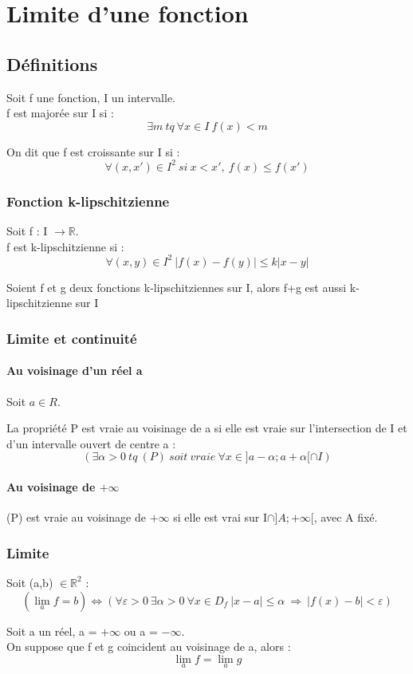 \chapter{Limite d'une fonction}
\section{Définitions}
\begin{de}
Soit f une fonction, I un intervalle. \\
f est majorée sur I si :$$\exists m~ tq~ \forall x \in I~ f(x) < m$$
\end{de}
\begin{de}
On dit que f est croissante sur I si :
$$\forall (x,x') \in I^2~ si~ x<x',~ f(x) \leq f(x')$$
\end{de}
\subsection{Fonction k-lipschitzienne}
\begin{de}
Soit f : I $\rightarrow \mathbb{R}$.\\
f est k-lipschitzienne si : 
$$\forall (x,y) \in I^2~ |f(x)-f(y)|\leq k|x-y|$$
\end{de}
\begin{prop}
Soient f et g deux fonctions k-lipschitziennes sur I, alors f+g est aussi k-lipschitzienne sur I
\end{prop}
\subsection{Limite et continuité}
\subsubsection{Au voisinage d'un réel a}
Soit $a \in R$.
\begin{de}
La propriété P est vraie au voisinage de a si elle est vraie sur l'intersection de I et d'un intervalle ouvert de centre a :
$$(\exists \alpha > 0~ tq~ (P)~ soit~ vraie~ \forall x \in ]a-\alpha;a+\alpha[\cap I)$$
\end{de}
\subsubsection{Au voisinage de $+\infty$}
\begin{de}
(P) est vraie au voisinage de $+\infty$ si elle est vrai sur I$\cap]A;+\infty[$, avec A fixé.
\end{de}
\subsection{Limite}
\begin{de}
Soit (a,b) $\in \mathbb{R}^2$ :
$$(\lim_a f = b) \Leftrightarrow (\forall \varepsilon > 0~ \exists \alpha > 0~ \forall x \in D_f~ |x-a|\leq \alpha~ \Rightarrow~ |f(x)-b|<\varepsilon)$$ 
\end{de}
\begin{prop}
Soit a un réel, a = $+\infty$ ou a = $-\infty$.\\
On suppose que f et g coincident au voisinage de a, alors : 
$$\lim_a f = \lim_a g$$
\end{prop}
